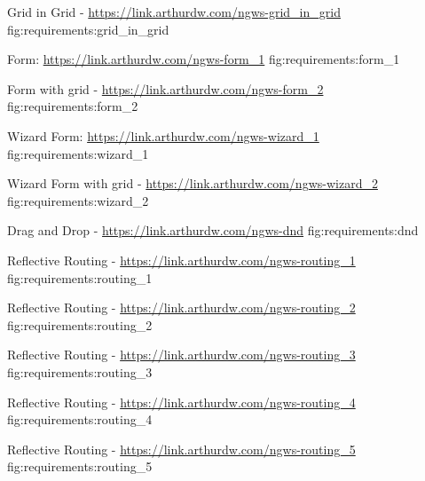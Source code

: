     {Grid in Grid - \url{https://link.arthurdw.com/ngws-grid_in_grid}}
    {fig:requirements:grid_in_grid}

    {Form: \url{https://link.arthurdw.com/ngws-form_1}}
    {fig:requirements:form_1}
    
    {Form with grid - \url{https://link.arthurdw.com/ngws-form_2}}
    {fig:requirements:form_2}

    {Wizard Form: \url{https://link.arthurdw.com/ngws-wizard_1}}
    {fig:requirements:wizard_1}
    
    {Wizard Form with grid - \url{https://link.arthurdw.com/ngws-wizard_2}}
    {fig:requirements:wizard_2}

    {Drag and Drop - \url{https://link.arthurdw.com/ngws-dnd}}
    {fig:requirements:dnd}
    
    {Reflective Routing - \url{https://link.arthurdw.com/ngws-routing_1}}
    {fig:requirements:routing_1}
    
    {Reflective Routing - \url{https://link.arthurdw.com/ngws-routing_2}}
    {fig:requirements:routing_2}

    {Reflective Routing - \url{https://link.arthurdw.com/ngws-routing_3}}
    {fig:requirements:routing_3}

    {Reflective Routing - \url{https://link.arthurdw.com/ngws-routing_4}}
    {fig:requirements:routing_4}

    {Reflective Routing - \url{https://link.arthurdw.com/ngws-routing_5}}
    {fig:requirements:routing_5}

